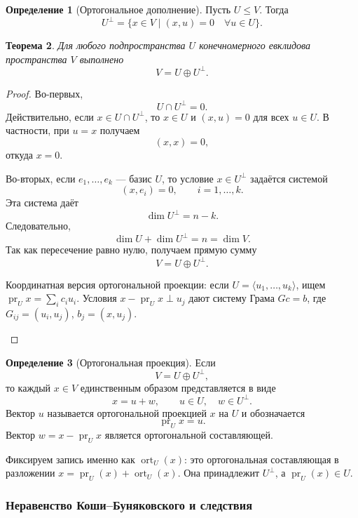\documentclass[12pt,a4paper]{article}
\theoremstyle{definition}
\newtheorem{definition}{Определение}[section]
\theoremstyle{plain}
\newtheorem{theorem}[definition]{Теорема}
\theoremstyle{remark}
\newenvironment{knowledgefix}{\begin{clarifybox}}{\end{clarifybox}}
\newcommand{\pr}{\operatorname{pr}}
\newcommand{\ort}{\operatorname{ort}}
\begin{document}
\begin{definition}[Ортогональное дополнение]
Пусть $U\le V$. Тогда
\[
    U^\perp=\{x\in V\mid (x,u)=0\quad \forall u\in U\}.
\]
\end{definition}

\begin{theorem}
Для любого подпространства $U$ конечномерного евклидова пространства $V$ выполнено
\[
    V=U\oplus U^\perp.
\]
\end{theorem}

\begin{proof}
Во-первых,
\[
    U\cap U^\perp=0.
\]
Действительно, если $x\in U\cap U^\perp$, то $x\in U$ и $(x,u)=0$ для всех $u\in U$.
В частности, при $u=x$ получаем
\[
    (x,x)=0,
\]
откуда $x=0$.

Во-вторых, если $e_1,\ldots,e_k$ --- базис $U$, то условие $x\in U^\perp$ задаётся системой
\[
    (x,e_i)=0,
    \qquad i=1,\ldots,k.
\]
Эта система даёт
\[
    \dim U^\perp=n-k.
\]
Следовательно,
\[
    \dim U+\dim U^\perp=n=\dim V.
\]
Так как пересечение равно нулю, получаем прямую сумму
\[
    V=U\oplus U^\perp.
\]
\begin{knowledgefix}
Координатная версия ортогональной проекции: если \(U=\langle u_1,
\ldots,u_k\rangle\), ищем \(\pr_U x=\sum_i c_i u_i\). Условия \(x-\pr_U x\perp u_j\) дают систему Грама \(Gc=b\), где \(G_{ij}=(u_i,u_j)\), \(b_j=(x,u_j)\).
\end{knowledgefix}
\end{proof}

\begin{definition}[Ортогональная проекция]
Если
\[
    V=U\oplus U^\perp,
\]
то каждый $x\in V$ единственным образом представляется в виде
\[
    x=u+w,
    \qquad u\in U,
    \quad w\in U^\perp.
\]
Вектор $u$ называется ортогональной проекцией $x$ на $U$ и обозначается
\[
    \pr_U x=u.
\]
Вектор $w=x-\pr_Ux$ является ортогональной составляющей.
\begin{knowledgefix}
Фиксируем запись именно как \(\ort_U(x)\): это ортогональная составляющая в разложении \(x=\pr_U(x)+\ort_U(x)\). Она принадлежит \(U^\perp\), а \(\pr_U(x)\in U\).
\end{knowledgefix}
\end{definition}

\subsubsection{Неравенство Коши--Буняковского и следствия}
\end{document}
